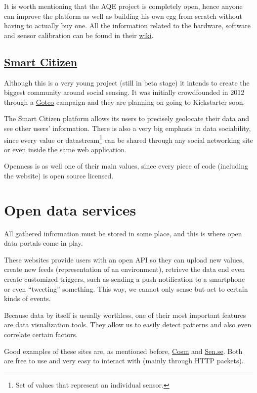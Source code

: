 It is worth mentioning that the AQE project is completely open, hence anyone can improve the platform as well as building his own egg from scratch without having to actually buy one. All the information related to the hardware, software and sensor calibration can be found in their \href{http://airqualityegg.wikispaces.org}{wiki}.

\subsection{\href{http://beta.smartcitizen.me}{Smart Citizen}}

Although this is a very young project (still in beta stage) it intends to create the biggest community around social sensing. It was initially crowdfounded in 2012 through a \href{http://goteo.org/project/smart-citizen-sensores-ciudadanos}{Goteo} campaign and they are planning on going to Kickstarter soon.

The Smart Citizen platform allows its users to precisely geolocate their data and see other users' information. There is also a very big emphasis in data sociability, since every value or datastream\footnote{Set of values that represent an individual sensor.} can be shared through any social networking site or even inside the same web application.

Openness is as well one of their main values, since every piece of code (including the website) is open source licensed.


\section{Open data services}

All gathered information must be stored in some place, and this is where open data portals come in play. 

These websites provide users with an open API so they can upload new values, create new feeds (representation of an environment), retrieve the data end even create customized triggers, such as sending a push notification to a smartphone or even ``tweeting'' something. This way, we cannot only sense but act to certain kinds of events. 

Because data by itself is usually worthless, one of their most important features are data visualization tools. They allow us to easily detect patterns and also even correlate certain factors.


Good examples of these sites are, as mentioned before, \href{http://www.cosm.com}{Cosm} and \href{http://open.sen.se/}{Sen.se}. Both are free to use and very easy to interact with (mainly through HTTP packets).
